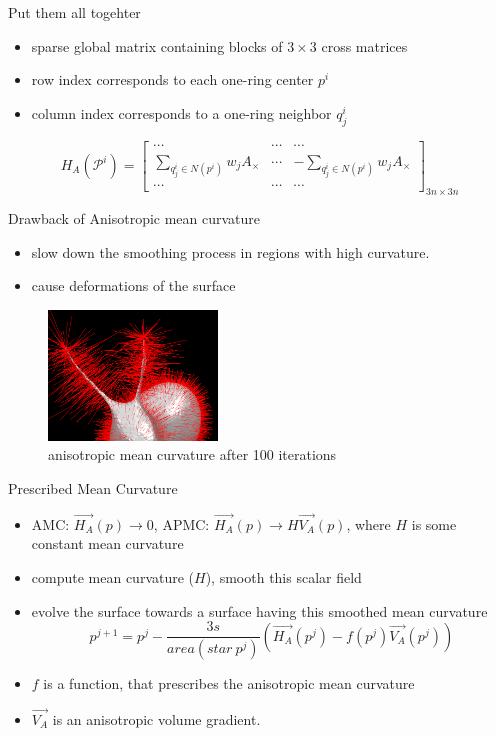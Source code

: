 \documentclass{beamer}
\begin{document}
\begin{frame}{Put them all togehter}
\begin{itemize}
\item sparse global matrix containing blocks of $3 \times 3$ cross matrices
\item row index corresponds to each one-ring center $p^i$
\item column index corresponds to a one-ring neighbor $q^i_j$
\end{itemize}
\begin{equation*}
H_A( \mathcal{P}^i ) = 
\begin{bmatrix} 
 \cdots & \cdots & \cdots \\
 \sum\limits_{q_j^i \in N(p^i)}{w_j A_{\times}} & \cdots & -\sum\limits_{q_j^i \in N(p^i)}{w_j A_{\times}} \\
 \cdots & \cdots & \cdots 
\end{bmatrix}_{3n \times 3n}
\end{equation*}
\end{frame}

\begin{frame}{Drawback of Anisotropic mean curvature}
\begin{itemize}
\item slow down the smoothing process in regions with high curvature. 
\item cause deformations of the surface
\end{itemize}
\begin{figure}[htb]
\centering
\includegraphics[width=0.4\textwidth]{aniso_bunny_100it.PNG}
\caption{anisotropic mean curvature after 100 iterations}
\label{fig:deform}
\end{figure}
\end{frame}

\begin{frame}{Prescribed Mean Curvature}
\begin{itemize}
\item AMC: $\vec{H_A}(p) \rightarrow 0$, APMC: $\vec{H_A}(p) \rightarrow H\vec{V_A}(p)$, where $H$ is some constant mean curvature
\item compute mean curvature ($H$), smooth this scalar field
\item evolve the surface towards a surface having this smoothed mean curvature
\begin{equation*}
p^{j+1} = p^{j} - \dfrac{3s}{area(star\ p^j)}(\vec{H_A}(p^j) - f(p^j)\vec{V_A}(p^j))
\end{equation*}
\item $f$ is a function, that prescribes the anisotropic mean curvature
\item $\vec{V_A}$ is an anisotropic volume gradient.
\end{itemize}
\end{frame}
\end{document}
